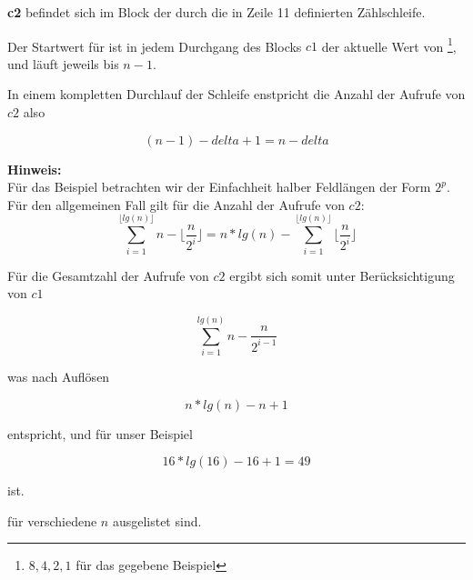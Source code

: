 \textbf{c2} befindet sich im Block der durch die in Zeile 11 definierten Zählschleife.

Der Startwert für  ist in jedem Durchgang des Blocks $c1$ der aktuelle Wert von \footnote{${8, 4, 2, 1}$ für das gegebene Beispiel}, und läuft jeweils bis $n - 1$.

In einem kompletten Durchlauf der Schleife enstpricht die Anzahl der Aufrufe von $c2$ also

\begin{equation}
(n - 1) - delta + 1 = n - delta
\end{equation}

\begin{tcolorbox}
    \textbf{Hinweis:}
    \\
    Für das Beispiel betrachten wir der Einfachheit halber Feldlängen der Form $2^p$.
    \\
    Für den allgemeinen Fall gilt für die Anzahl der Aufrufe von $c2$:\\

    \begin{equation}
        \nonumber
        \sum_{i=1}^{\lfloor lg(n) \rfloor} n - \lfloor \frac{n}{2^i} \rfloor = n * lg(n) - \sum_{i=1}^{\lfloor lg(n) \rfloor} \lfloor \frac{n}{2^i} \rfloor
    \end{equation}
\end{tcolorbox}

Für die  Gesamtzahl der Aufrufe von $c2$ ergibt sich somit unter Berücksichtigung von $c1$

\begin{equation}
\sum_{i=1}^{lg(n)} n - \frac{n}{2^{i-1}}
\end{equation}

was nach Auflösen

\begin{equation}
    n * lg(n) - n + 1
\end{equation}

entspricht, und für unser Beispiel

\begin{equation}
    16 * lg(16) - 16 + 1 = 49
\end{equation}

ist.

für verschiedene $n$ ausgelistet sind.

